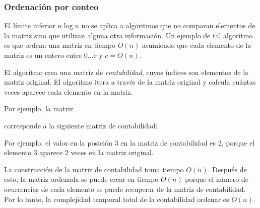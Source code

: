 \subsubsection{Ordenación por conteo}


El límite inferior $n \log n$ no se aplica a
algoritmos que no comparan elementos de la matriz
sino que utilizan alguna otra información.
Un ejemplo de tal algoritmo es
 que ordena una matriz en
tiempo $O(n)$ asumiendo que cada elemento de la matriz
es un entero entre $0 \ldots c$ y $c=O(n)$.

El algoritmo crea una matriz de \emph{contabilidad},
cuyos índices son elementos de la matriz original.
El algoritmo itera a través de la matriz original
y calcula cuántas veces aparece cada elemento
en la matriz.
\newpage

Por ejemplo, la matriz
\begin{center}
\end{center}
corresponde a la siguiente matriz de contabilidad:
\begin{center}
\end{center}

Por ejemplo, el valor en la posición 3
en la matriz de contabilidad es 2,
porque el elemento 3 aparece 2 veces
en la matriz original.

La construcción de la matriz de contabilidad
toma tiempo $O(n)$. Después de esto, la matriz ordenada
se puede crear en tiempo $O(n)$ porque
el número de ocurrencias de cada elemento se puede recuperar
de la matriz de contabilidad.
Por lo tanto, la complejidad temporal total de la contabilidad
ordenar es $O(n)$.

